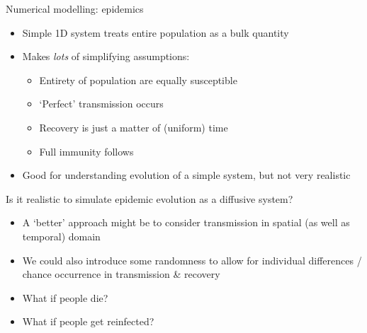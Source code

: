 

\begin{frame}{\insertsectionnumber{ |} Numerical modelling: epidemics}

\begin{beamerboxesrounded}[lower=gray,shadow=true]{

\begin{itemize}
\item Simple 1D system treats entire population as a bulk quantity
\item Makes \emph{lots} of simplifying assumptions:
\begin{itemize}
\item Entirety of population are equally susceptible
\item `Perfect' transmission occurs
\item Recovery is just a matter of (uniform) time
\item Full immunity follows
\end{itemize}
\item Good for understanding evolution of a simple system, but not very realistic
\end{itemize}

}

\end{beamerboxesrounded}

\vspace*{1cm}\begin{beamerboxesrounded}[lower=gray,shadow=true]{

Is it realistic to simulate epidemic evolution as a diffusive system?

\begin{itemize}
\item A `better' approach might be to consider transmission in spatial (as well as temporal) domain
\item We could also introduce some randomness to allow for individual differences / chance occurrence in transmission \& recovery
\item What if people die?
\item What if people get reinfected?
\end{itemize}
}

\end{beamerboxesrounded}
\end{frame}






